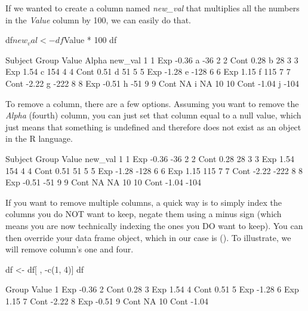If we wanted to create a column named \textit{new\_val} that multiplies all the numbers in the \textit{Value} column by 100, we can easily do that.

\begin{inR}
df$new_val <- df$Value * 100
df
\end{inR}
\begin{outR}
   Subject Group Value Alpha new_val
1        1   Exp -0.36     a     -36
2        2  Cont  0.28     b      28
3        3   Exp  1.54     c     154
4        4  Cont  0.51     d      51
5        5   Exp -1.28     e    -128
6        6   Exp  1.15     f     115
7        7  Cont -2.22     g    -222
8        8   Exp -0.51     h     -51
9        9  Cont    NA     i      NA
10      10  Cont -1.04     j    -104
\end{outR}

To remove a column, there are a few options. Assuming you want to remove the \textit{Alpha} (fourth) column, you can just set that column equal to a \gls{null value}, which just means that something is undefined and therefore does not exist as an object in the R language.

\begin{outR}
   Subject Group Value new_val
1        1   Exp -0.36     -36
2        2  Cont  0.28      28
3        3   Exp  1.54     154
4        4  Cont  0.51      51
5        5   Exp -1.28    -128
6        6   Exp  1.15     115
7        7  Cont -2.22    -222
8        8   Exp -0.51     -51
9        9  Cont    NA      NA
10      10  Cont -1.04    -104
\end{outR}

If you want to remove multiple columns, a quick way is to simply index the columns you do NOT want to keep, negate them using a minus sign (which means you are now technically indexing the ones you DO want to keep).  You can then override your data frame object, which in our case is (). To illustrate, we will remove column's one and four.

\begin{inR}
df <- df[ , -c(1, 4)]
df
\end{inR}
\begin{outR}
   Group Value
1    Exp -0.36
2   Cont  0.28
3    Exp  1.54
4   Cont  0.51
5    Exp -1.28
6    Exp  1.15
7   Cont -2.22
8    Exp -0.51
9   Cont    NA
10  Cont -1.04
\end{outR}

